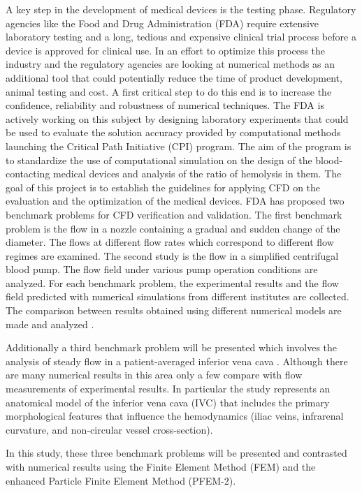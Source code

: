 A key step in the development of medical devices is the testing phase. Regulatory agencies like the Food and Drug Administration (FDA) require extensive laboratory testing and a long, tedious and expensive clinical trial process before a device is approved for clinical use. In an effort to optimize this process the industry and the regulatory agencies are looking at numerical methods as an additional tool that could potentially reduce the time of product development, animal testing and cost. A first critical step to do this end is to increase the confidence, reliability and robustness of numerical techniques. The FDA is actively working on this subject by designing laboratory experiments that could be used to evaluate the solution accuracy provided by computational methods launching the Critical Path Initiative (CPI) \cite{cpi} program. The aim of the program is to standardize the use of computational simulation on the design of the blood-contacting medical
devices and analysis of the ratio of hemolysis in them. The goal of this project is to establish the guidelines for
applying CFD on the evaluation and the optimization of the medical devices. FDA has proposed two benchmark
problems \cite{cpi1} for CFD verification and validation. The first benchmark problem is the flow in a nozzle
containing a gradual and sudden change of the diameter. The flows at different flow rates which
correspond to different flow regimes are examined. The second study is the flow in a simplified centrifugal
blood pump. The flow field under various pump operation conditions are analyzed. For each benchmark
problem, the experimental results \cite{fda_res,fda_nozzle,fda_pump} and the flow field predicted with numerical simulations \cite{fda_numrob,hariharan_nozzle,nassau_pump,heck_hemo} from
different institutes are collected. The comparison between results obtained using different numerical models are
made and analyzed \cite{stewart_cfd,mali_cfd}. 

Additionally a third benchmark problem will be presented which involves the analysis of steady flow in a patient-averaged inferior vena cava \cite{gallagher_exp,craven_cfd}. Although there are many numerical results in this area only a few compare with flow measurements of experimental results. In particular the study represents an anatomical model of the  inferior vena cava (IVC) that includes the primary morphological features that influence the hemodynamics (iliac veins, infrarenal curvature, and non-circular vessel cross-section).

In this study, these three benchmark problems will be presented and contrasted with numerical results using the Finite Element Method (FEM) and the enhanced Particle Finite Element Method (PFEM-2).

